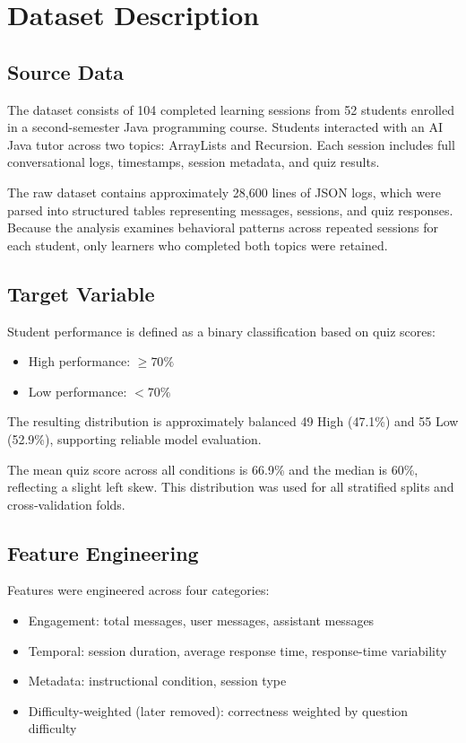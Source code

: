 \documentclass[conference]{IEEEtran}
\begin{document}
\section{Dataset Description}

\subsection{Source Data}
The dataset consists of 104 completed learning sessions from 52 students enrolled in a second-semester Java programming course. Students interacted with an AI Java tutor across two topics: ArrayLists and Recursion. Each session includes full conversational logs, timestamps, session metadata, and quiz results.

The raw dataset contains approximately 28,600 lines of JSON logs, which were parsed into structured tables representing messages, sessions, and quiz responses. Because the analysis examines behavioral patterns across repeated sessions for each student, only learners who completed both topics were retained. 

\subsection{Target Variable}
Student performance is defined as a binary classification based on quiz scores:
\begin{itemize}[noitemsep]
    \item High performance: $\geq 70\%$
    \item Low performance: $< 70\%$
\end{itemize}


The resulting distribution is approximately balanced 49 High (47.1\%) and 55 Low (52.9\%), supporting reliable model evaluation. 

The mean quiz score across all conditions is 66.9\% and the median is 60\%, reflecting a slight left skew. This distribution was used for all stratified splits and cross‑validation folds.

\subsection{Feature Engineering}
Features were engineered across four categories:
\begin{itemize}
    \item Engagement: total messages, user messages, assistant messages
    \item Temporal: session duration, average response time, response-time variability
    \item Metadata: instructional condition, session type
    \item Difficulty-weighted (later removed): correctness weighted by question difficulty
\end{itemize}
\end{document}
